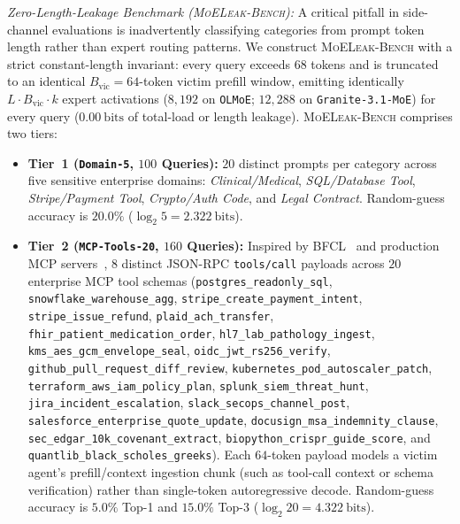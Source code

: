 \documentclass[final,5p,times,twocolumn]{elsarticle}
\theoremstyle{definition}
\theoremstyle{remark}
\newcommand{\MLB}{\textsc{MoELeak-Bench}}
\begin{document}
\emph{Zero-Length-Leakage Benchmark (\MLB{}):} A critical pitfall in side-channel evaluations is inadvertently classifying categories from prompt token length rather than expert routing patterns. We construct \MLB{} with a strict constant-length invariant: every query exceeds $68$ tokens and is truncated to an identical $B_{\mathrm{vic}} = 64$-token victim prefill window, emitting identically $L \cdot B_{\mathrm{vic}} \cdot k$ expert activations ($8{,}192$ on \texttt{OLMoE}; $12{,}288$ on \texttt{Granite-3.1-MoE}) for every query ($0.00~\mathrm{bits}$ of total-load or length leakage). \MLB{} comprises two tiers:
\begin{itemize}
  \item \textbf{Tier~1 (\texttt{Domain-5}, $100$ Queries):} $20$ distinct prompts per category across five sensitive enterprise domains: \emph{Clinical/Medical}, \emph{SQL/Database Tool}, \emph{Stripe/Payment Tool}, \emph{Crypto/Auth Code}, and \emph{Legal Contract}. Random-guess accuracy is $20.0\%$ ($\log_2 5 = 2.322~\mathrm{bits}$).
  \item \textbf{Tier~2 (\texttt{MCP-Tools-20}, $160$ Queries):} Inspired by BFCL~\cite{patil2024bfcl} and production MCP servers~\cite{anthropic2024mcp}, $8$ distinct JSON-RPC \texttt{tools/call} payloads across $20$ enterprise MCP tool schemas (\texttt{postgres\_readonly\_sql}, \texttt{snowflake\_warehouse\_agg}, \texttt{stripe\_create\_payment\_intent}, \texttt{stripe\_issue\_refund}, \texttt{plaid\_ach\_transfer}, \texttt{fhir\_patient\_medication\_order}, \texttt{hl7\_lab\_pathology\_ingest}, \texttt{kms\_aes\_gcm\_envelope\_seal}, \texttt{oidc\_jwt\_rs256\_verify}, \texttt{github\_pull\_request\_diff\_review}, \texttt{kubernetes\_pod\_autoscaler\_patch}, \texttt{terraform\_aws\_iam\_policy\_plan}, \texttt{splunk\_siem\_threat\_hunt}, \texttt{jira\_incident\_escalation}, \texttt{slack\_secops\_channel\_post}, \texttt{salesforce\_enterprise\_quote\_update}, \texttt{docusign\_msa\_indemnity\_clause}, \texttt{sec\_edgar\_10k\_covenant\_extract}, \texttt{biopython\_crispr\_guide\_score}, and \texttt{quantlib\_black\_scholes\_greeks}). Each $64$-token payload models a victim agent's prefill/context ingestion chunk (such as tool-call context or schema verification) rather than single-token autoregressive decode. Random-guess accuracy is $5.0\%$ Top-1 and $15.0\%$ Top-3 ($\log_2 20 = 4.322~\mathrm{bits}$).
\end{itemize}
\end{document}
